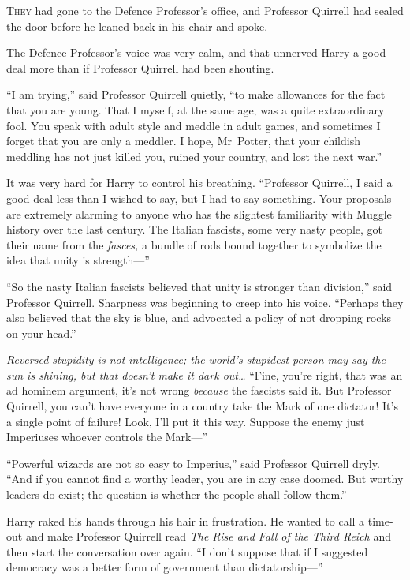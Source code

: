 
\lettrine{T}{hey} had gone to
the Defence Professor’s office, and Professor Quirrell had sealed the door
before he leaned back in his chair and spoke.

The Defence Professor’s voice was very calm, and that unnerved Harry a good
deal more than if Professor Quirrell had been shouting.

“I am trying,” said Professor Quirrell quietly, “to make allowances for the
fact that you are young. That I myself, at the same age, was a quite
extraordinary fool. You speak with adult style and meddle in adult games, and
sometimes I forget that you are only a meddler. I hope, Mr~Potter, that your
childish meddling has not just killed you, ruined your country, and lost the
next war.”

It was very hard for Harry to control his breathing. “Professor Quirrell, I
said a good deal less than I wished to say, but I had to say something. Your
proposals are extremely alarming to anyone who has the slightest familiarity
with Muggle history over the last century. The Italian fascists, some very
nasty people, got their name from the \emph{fasces,} a bundle of rods bound
together to symbolize the idea that unity is strength—”

“So the nasty Italian fascists believed that unity is stronger than division,”
said Professor Quirrell. Sharpness was beginning to creep into his voice.
“Perhaps they also believed that the sky is blue, and advocated a policy of not
dropping rocks on your head.”

\emph{Reversed stupidity is not intelligence; the world’s stupidest person may
say the sun is shining, but that doesn’t make it dark out…} “Fine,
you’re right, that was an ad hominem argument, it’s not wrong \emph{because}
the fascists said it. But Professor Quirrell, you can’t have everyone in a
country take the Mark of one dictator! It’s a single point of failure! Look,
I’ll put it this way. Suppose the enemy just Imperiuses whoever controls the
Mark—”

“Powerful wizards are not so easy to Imperius,” said Professor Quirrell dryly.
“And if you cannot find a worthy leader, you are in any case doomed. But worthy
leaders do exist; the question is whether the people shall follow them.”

Harry raked his hands through his hair in frustration. He wanted to call a
time-out and make Professor Quirrell read \emph{The Rise and Fall of the Third
Reich} and then start the conversation over again. “I don’t suppose that if I
suggested democracy was a better form of government than dictatorship—”

